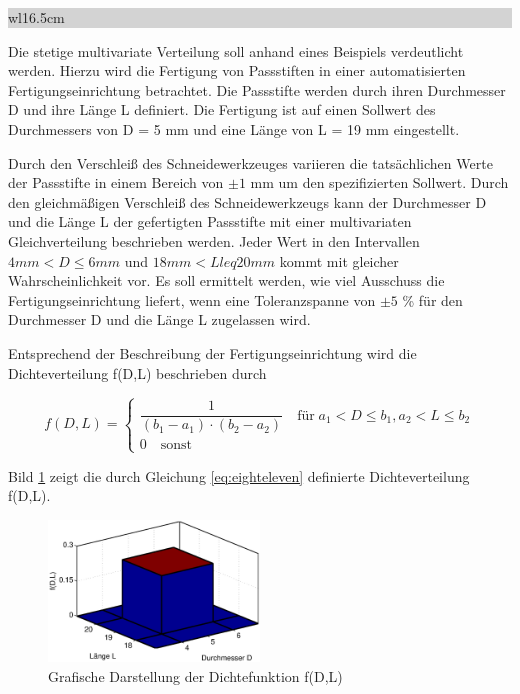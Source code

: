 \noindent
\colorbox{lightgray}{%
%
\renewcommand\arraystretch{0.6}%
\begin{tabular}{ wl{16.5cm} }
{\selectfont
{}}
\end{tabular}%
}\medskip

\noindent Die stetige multivariate Verteilung soll anhand eines Beispiels verdeutlicht werden. Hierzu wird die Fertigung von Passstiften in einer automatisierten Fertigungseinrichtung betrachtet. Die Passstifte werden durch ihren Durchmesser D und ihre L\"{a}nge L definiert. Die Fertigung ist auf einen Sollwert des Durchmessers von D = 5 mm und eine L\"{a}nge von L = 19 mm eingestellt.\newline

\noindent Durch den Verschlei{\ss} des Schneidewerkzeuges variieren die tats\"{a}chlichen Werte der Passstifte in einem Bereich von $\pm 1$  mm um den spezifizierten Sollwert. Durch den gleichm\"{a}{\ss}igen Verschlei{\ss} des Schneidewerkzeugs kann der Durchmesser D und die L\"{a}nge L der gefertigten Passstifte mit einer multivariaten Gleichverteilung beschrieben werden. Jeder Wert in den Intervallen  $4 mm < D \leq 6 mm$  und  $18 mm <  L leq 20 mm$  kommt mit gleicher Wahrscheinlichkeit vor. Es soll ermittelt werden, wie viel Ausschuss die Fertigungseinrichtung liefert, wenn eine Toleranzspanne von $ \pm 5$  \% f\"{u}r den Durchmesser D und die L\"{a}nge L zugelassen wird.\newline

\noindent Entsprechend der Beschreibung der Fertigungseinrichtung wird die Dichteverteilung f(D,L) beschrieben durch

\begin{equation}\label{eq:eighteleven}
f(D,L)=\left\{\begin{array}{l} {\dfrac{1}{(b_{1} -a_{1})\cdot (b_{2} -a_{2})} \quad \text{für} \; a_{1} <D \le b_{1} ,a_{2} <L\le b_{2} } \\ 
{ 0 \quad \text{sonst}} \end{array}\right.
\end{equation}

\noindent Bild \ref{fig:Passstifte1} zeigt die durch Gleichung \eqref{eq:eighteleven} definierte Dichteverteilung f(D,L).

\noindent 
\begin{figure}[H]
  \centerline{\includegraphics[width=0.5\textwidth]{Kapitel8/Bilder/image3}}
  \caption{Grafische Darstellung der Dichtefunktion f(D,L)}
  \label{fig:Passstifte1}
\end{figure}

